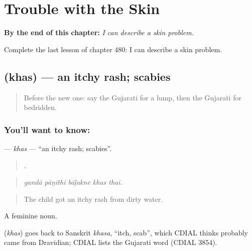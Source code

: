 
\chapter{Trouble with the Skin}
\label{ch:gu-trouble-with-the-skin}

\begin{chapteropening}
\textbf{By the end of this chapter:} \emph{I can describe a skin problem.}

Complete the last lesson of chapter 480: I can describe a skin problem.
\end{chapteropening}

\section[\texorpdfstring{\gu{ખસ} (khas)}{ખસ (khas)}]{ (khas) — an itchy rash; scabies}

\label{lesson:GU-C480-khas}



\begin{quote}
Before the new one: say the Gujarati for a lump, then the Gujarati for bedridden.
\end{quote}

\subsection*{You'll want to know: }
\textbf{} — \emph{khas} — \textquotedblleft{}an itchy rash; scabies\textquotedblright{}.

\begin{quote}
    .
\end{quote}

\begin{quote}
\emph{gandā pāṇīthī bāḷakne khas thaī.}
\end{quote}

\begin{quote}
The child got an itchy rash from dirty water.
\end{quote}

A feminine noun.

\begin{cousinweb}
\textbf{} (\emph{khas}) goes back to Sanskrit \emph{khasa}, \textquotedblleft{}itch, scab\textquotedblright{}, which CDIAL thinks probably came from Dravidian; CDIAL lists the Gujarati word (CDIAL 3854).
\end{cousinweb}

